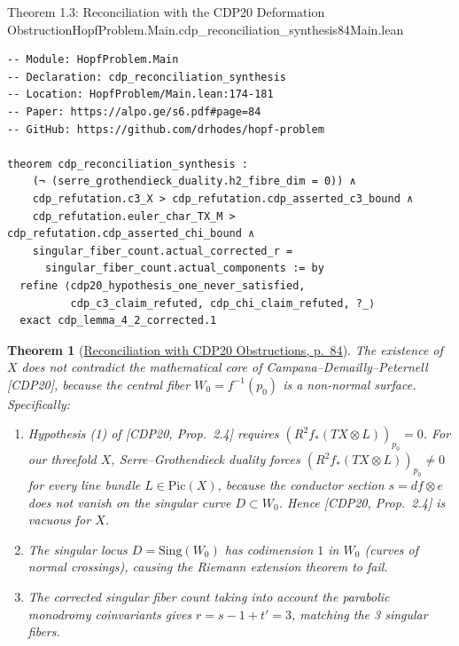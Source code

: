 \documentclass[10pt]{article}
\newtheorem{theorem}{Theorem}[section]
\newcommand{\Pic}{\mathrm{Pic}}
\gdef\hashchar{#}
\newcommand{\paperref}[2]{\href{https://alpo.ge/s6.pdf\hashchar page=#1}{#2}}
\begin{document}
\begin{comparativeblock}{Theorem 1.3: Reconciliation with the CDP20 Deformation Obstruction}{HopfProblem.Main.cdp_reconciliation_synthesis}{84}{Main.lean}
\begin{verbatim}
-- Module: HopfProblem.Main
-- Declaration: cdp_reconciliation_synthesis
-- Location: HopfProblem/Main.lean:174-181
-- Paper: https://alpo.ge/s6.pdf#page=84
-- GitHub: https://github.com/drhodes/hopf-problem

theorem cdp_reconciliation_synthesis :
    (¬ (serre_grothendieck_duality.h2_fibre_dim = 0)) ∧
    cdp_refutation.c3_X > cdp_refutation.cdp_asserted_c3_bound ∧
    cdp_refutation.euler_char_TX_M > cdp_refutation.cdp_asserted_chi_bound ∧
    singular_fiber_count.actual_corrected_r =
      singular_fiber_count.actual_components := by
  refine ⟨cdp20_hypothesis_one_never_satisfied,
          cdp_c3_claim_refuted, cdp_chi_claim_refuted, ?_⟩
  exact cdp_lemma_4_2_corrected.1
\end{verbatim}
\tcblower
\begin{theorem}[\paperref{84}{Reconciliation with CDP20 Obstructions, p.~84}]\label{thm:cdp-reconciliation}
The existence of $X$ does not contradict the mathematical core of Campana--Demailly--Peternell [CDP20], because the central fiber $W_0 = f^{-1}(p_0)$ is a non-normal surface. Specifically:
\begin{enumerate}[label=(\roman*), itemsep=1pt, parsep=0pt]
    \item Hypothesis (1) of [CDP20, Prop.~2.4] requires $(R^2 f_*(TX \otimes L))_{p_0} = 0$. For our threefold $X$, Serre--Grothendieck duality forces $(R^2 f_*(TX \otimes L))_{p_0} \ne 0$ for \emph{every} line bundle $L \in \Pic(X)$, because the conductor section $s = df \otimes e$ does not vanish on the singular curve $D \subset W_0$. Hence [CDP20, Prop.~2.4] is vacuous for $X$.
    \item The singular locus $D = \mathrm{Sing}(W_0)$ has codimension $1$ in $W_0$ (curves of normal crossings), causing the Riemann extension theorem to fail.
    \item The corrected singular fiber count taking into account the parabolic monodromy coinvariants gives $r = s - 1 + t' = 3$, matching the 3 singular fibers.
\end{enumerate}
\end{theorem}
\end{comparativeblock}
\end{document}

